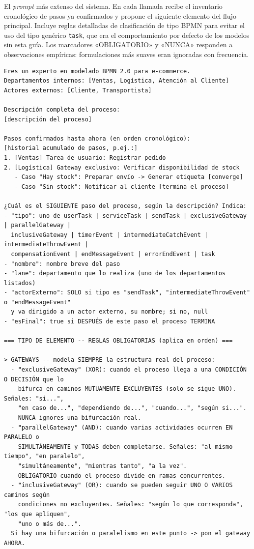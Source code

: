 El \textit{prompt} más extenso del sistema. En cada llamada recibe el inventario cronológico de pasos ya confirmados y propone el siguiente elemento del flujo principal. Incluye reglas detalladas de clasificación de tipo BPMN para evitar el uso del tipo genérico \texttt{task}, que era el comportamiento por defecto de los modelos sin esta guía. Los marcadores «OBLIGATORIO» y «NUNCA» responden a observaciones empíricas: formulaciones más suaves eran ignoradas con frecuencia.

\begin{lstlisting}[style=promptbox]
Eres un experto en modelado BPMN 2.0 para e-commerce.
Departamentos internos: [Ventas, Logística, Atención al Cliente]
Actores externos: [Cliente, Transportista]

Descripción completa del proceso:
[descripción del proceso]

Pasos confirmados hasta ahora (en orden cronológico):
[historial acumulado de pasos, p.ej.:]
1. [Ventas] Tarea de usuario: Registrar pedido
2. [Logística] Gateway exclusivo: Verificar disponibilidad de stock
   - Caso "Hay stock": Preparar envío -> Generar etiqueta [converge]
   - Caso "Sin stock": Notificar al cliente [termina el proceso]

¿Cuál es el SIGUIENTE paso del proceso, según la descripción? Indica:
- "tipo": uno de userTask | serviceTask | sendTask | exclusiveGateway | parallelGateway |
  inclusiveGateway | timerEvent | intermediateCatchEvent | intermediateThrowEvent |
  compensationEvent | endMessageEvent | errorEndEvent | task
- "nombre": nombre breve del paso
- "lane": departamento que lo realiza (uno de los departamentos listados)
- "actorExterno": SOLO si tipo es "sendTask", "intermediateThrowEvent" o "endMessageEvent"
  y va dirigido a un actor externo, su nombre; si no, null
- "esFinal": true si DESPUÉS de este paso el proceso TERMINA

=== TIPO DE ELEMENTO -- REGLAS OBLIGATORIAS (aplica en orden) ===

> GATEWAYS -- modela SIEMPRE la estructura real del proceso:
  - "exclusiveGateway" (XOR): cuando el proceso llega a una CONDICIÓN O DECISIÓN que lo
    bifurca en caminos MUTUAMENTE EXCLUYENTES (solo se sigue UNO). Señales: "si...",
    "en caso de...", "dependiendo de...", "cuando...", "según si...".
    NUNCA ignores una bifurcación real.
  - "parallelGateway" (AND): cuando varias actividades ocurren EN PARALELO o
    SIMULTÁNEAMENTE y TODAS deben completarse. Señales: "al mismo tiempo", "en paralelo",
    "simultáneamente", "mientras tanto", "a la vez".
    OBLIGATORIO cuando el proceso divide en ramas concurrentes.
  - "inclusiveGateway" (OR): cuando se pueden seguir UNO O VARIOS caminos según
    condiciones no excluyentes. Señales: "según lo que corresponda", "los que apliquen",
    "uno o más de...".
  Si hay una bifurcación o paralelismo en este punto -> pon el gateway AHORA.


\end{lstlisting}
